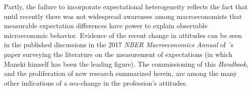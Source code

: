 Partly, the failure to incorporate expectational heterogeneity reflects the fact that until recently there was not widespread awareness among macroeconomists that measurable expectation differences have power to explain observable microeconomic behavior.  Evidence of the recent change in attitudes can be seen in the published discussions in the 2017 \textit{NBER Macroeconomics Annual} of~\cite{manski2017survey}'s paper surveying the literature on the measurement of expectations (in which Manski himself has been the leading figure).  The commissioning of this \emph{Handbook}, and the proliferation of new research summarized herein, are among the many other indications of a sea-change in the profession's attitudes. 



